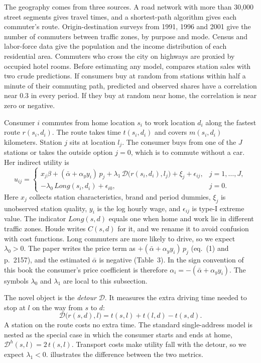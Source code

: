 The geography comes from three sources. A road network with more than 30,000 street segments gives travel times,
and a shortest-path algorithm gives each commuter's route. Origin-destination surveys from 1991, 1996 and 2001 give
the number of commuters between traffic zones, by purpose and mode. Census and labor-force data give the population
and the income distribution of each residential area. Commuters who cross the city on highways are proxied by
occupied hotel rooms. Before estimating any model, \citet[Figure 2]{Houde2012} compares station sales with two
crude predictions. If consumers buy at random from stations within half a minute of their commuting path, predicted
and observed shares have a correlation near 0.3 in every period. If they buy at random near home, the correlation is
near zero or negative.

Consumer $i$ commutes from home location $s_i$ to work location $d_i$ along the fastest route $r(s_i, d_i)$. The
route takes time $t(s_i,d_i)$ and covers $m(s_i,d_i)$ kilometers. Station $j$ sits at location $l_j$. The consumer
buys from one of the $J$ stations or takes the outside option $j = 0$, which is to commute without a car. Her
indirect utility is \citep[eq.~(1)]{Houde2012}
\begin{equation}\label{eq:11-houde-u}
u_{ij} =
\begin{cases}
x_j\beta + (\bar\alpha + \alpha_y y_i)\,p_j + \lambda_1\,\mathcal{D}\big(r(s_i,d_i), l_j\big) + \xi_j + \epsilon_{ij},
& j = 1,\dots,J,\\[2pt]
-\lambda_0\,\mathit{Long}(s_i,d_i) + \epsilon_{i0}, & j = 0.
\end{cases}
\end{equation}
Here $x_j$ collects station characteristics, brand and period dummies, $\xi_j$ is unobserved station quality,
$y_i$ is the log hourly wage, and $\epsilon_{ij}$ is type-I extreme value. The indicator $\mathit{Long}(s,d)$
equals one when home and work lie in different traffic zones. Houde writes $C(s,d)$ for it, and we rename it to avoid
confusion with cost functions. Long commuters are more likely to drive, so we expect
$\lambda_0 > 0$. The paper writes the price term as $+(\bar\alpha + \alpha_y y_i)\,p_j$ (eq.~(1) and p.~2157), and
the estimated $\bar\alpha$ is negative (Table~3). In the sign convention of this book the consumer's price
coefficient is therefore $\alpha_i = -(\bar\alpha + \alpha_y y_i)$. The symbols $\lambda_0$ and $\lambda_1$ are local
to this subsection.

The novel object is the \emph{detour} $\mathcal{D}$. It measures the extra driving time needed to stop at $l$ on the
way from $s$ to $d$:
\begin{equation}\label{eq:11-houde-detour}
\mathcal{D}\big(r(s,d), l\big) = t(s,l) + t(l,d) - t(s,d).
\end{equation}
A station on the route costs no extra time. The standard single-address model is nested as the special case in which
the consumer starts and ends at home, $\mathcal{D}^h(s,l) = 2\,t(s,l)$. Transport costs make utility fall with the
detour, so we expect $\lambda_1 < 0$.  illustrates the difference between the two metrics.

